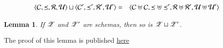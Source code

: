 \documentclass{elsarticle}
\newtheorem{lemma}{Lemma}
\begin{document}
\begin{definition}
\begin{eqnarray}
   \langle{\mathcal{C}},{\preceq},{\mathcal{R}},{\mathcal{U}}\rangle\sqcup\langle{\mathcal{C}'},{\preceq'},{\mathcal{R}'},{\mathcal{U}'}\rangle&=&\langle{\mathcal{C}\uplus\mathcal{C}},{\preceq\uplus\preceq'},{\mathcal{R}\uplus\mathcal{R}'},{\mathcal{U}\uplus\mathcal{U}'}\rangle
\end{eqnarray}
\end{definition}
\begin{lemma}
   If $\mathscr{Z}$ and $\mathscr{Z}'$ are schemas, then so is $\mathscr{Z}\sqcup\mathscr{Z}'$.
\end{lemma}
The proof of this lemma is published \href{location.domain}{here}
\end{document}
